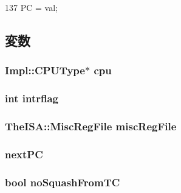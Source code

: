 \begin{DoxyCode}
137     { PC = val; }
\end{DoxyCode}


\subsection{変数}
\hypertarget{structOzoneThreadState_aa1c01120932caab88aa8c589c99e67a8}{
\subsubsection[{cpu}]{\setlength{\rightskip}{0pt plus 5cm}Impl::CPUType$\ast$ {\bf cpu}}}
\label{structOzoneThreadState_aa1c01120932caab88aa8c589c99e67a8}
\hypertarget{structOzoneThreadState_a94e9e9794cd8eb8eac7573761a31414d}{
\subsubsection[{intrflag}]{\setlength{\rightskip}{0pt plus 5cm}int {\bf intrflag}}}
\label{structOzoneThreadState_a94e9e9794cd8eb8eac7573761a31414d}
\hypertarget{structOzoneThreadState_a0b61a64e9ea4f2fb9bd5d726cd256caf}{
\subsubsection[{miscRegFile}]{\setlength{\rightskip}{0pt plus 5cm}TheISA::MiscRegFile {\bf miscRegFile}}}
\label{structOzoneThreadState_a0b61a64e9ea4f2fb9bd5d726cd256caf}
\hypertarget{structOzoneThreadState_a3bda64c96331af0ad914c5873b7074b5}{
\subsubsection[{nextPC}]{ {\bf nextPC}}}
\label{structOzoneThreadState_a3bda64c96331af0ad914c5873b7074b5}
\hypertarget{structOzoneThreadState_afdfc33b720511483d84f7098ab6ba075}{
\subsubsection[{noSquashFromTC}]{\setlength{\rightskip}{0pt plus 5cm}bool {\bf noSquashFromTC}}}
